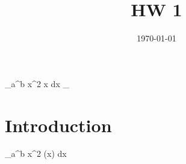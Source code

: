 \documentclass{article}
\title{HW 1}
\date{\today}
\begin{document}
\maketitle
\int_a^b x^2 \cos x dx
\int_ 
\section{Introduction}
\int_a^b x^2  \cos(x)  dx
\end{document}
